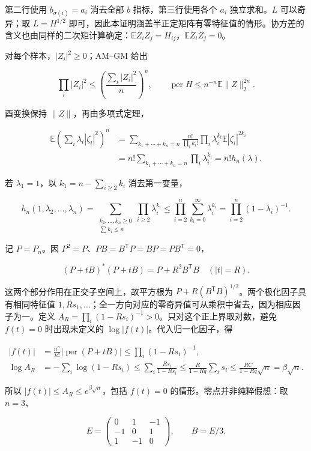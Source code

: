 \documentclass[11pt,a4paper]{article}
\begin{document}
第二行使用 \(b_{\sigma(i)}=a_i\) 消去全部 \(b\) 指标，第三行使用各个 \(a_i\) 独立求和。\(L\) 可以奇异；取 \(L=H^{1/2}\) 即可，因此本证明涵盖半正定矩阵有零特征值的情形。协方差的含义也由同样的二次矩计算确定：\(\mathbb EZ_i\overline Z_j=H_{ij}\)，\(\mathbb EZ_iZ_j=0\)。

对每个样本，\(|Z_i|^2\ge0\)；AM--GM 给出

\[
\prod_i|Z_i|^2\le\left(\frac{\sum_i|Z_i|^2}{n}\right)^n,
\qquad \operatorname{per}H\le n^{-n}\mathbb E\|Z\|_2^{2n}.
\]

酉变换保持 \(\|Z\|\)，再由多项式定理，

\[
\begin{aligned}
\mathbb E\left(\sum_i\lambda_i|\zeta_i|^2\right)^n
&=\sum_{k_1+\cdots+k_n=n}\frac{n!}{\prod_i k_i!}
\prod_i\lambda_i^{k_i}\mathbb E|\zeta_i|^{2k_i}\\
&=n!\sum_{k_1+\cdots+k_n=n}\prod_i\lambda_i^{k_i}
=n!h_n(\lambda).
\end{aligned}
\]

若 \(\lambda_1=1\)，以 \(k_1=n-\sum_{i\ge2}k_i\) 消去第一变量，

\[
h_n(1,\lambda_2,\ldots,\lambda_n)
=\sum_{\substack{k_2,\ldots,k_n\ge0\\\sum k_i\le n}}\prod_{i\ge2}\lambda_i^{k_i}
\le\prod_{i=2}^n\sum_{k_i=0}^{\infty}\lambda_i^{k_i}
=\prod_{i=2}^n(1-\lambda_i)^{-1}.
\]

记 \(P=P_n\)。因 \(P^2=P\)、\(PB=B^{\mathsf T}P=BP=PB^{\mathsf T}=0\)，

\[
(P+tB)^*(P+tB)=P+R^2B^{\mathsf T}B
\quad(|t|=R).
\]

这两个部分作用在正交子空间上，故平方根为 \(P+R(B^{\mathsf T}B)^{1/2}\)。两个极化因子具有相同特征值 \(1,Rs_1,\ldots\)；全一方向对应的零奇异值可从乘积中省去，因为相应因子为一。定义 \(A_R=\prod_i(1-Rs_i)^{-1}>0\)。只对这个正上界取对数，避免 \(f(t)=0\) 时出现未定义的 \(\log|f(t)|\)。代入归一化因子，得

\[
\begin{aligned}
|f(t)|&=\frac{n^n}{n!}|\operatorname{per}(P+tB)|
\le\prod_i(1-Rs_i)^{-1},\\
\log A_R&=-\sum_i\log(1-Rs_i)\le\sum_i\frac{Rs_i}{1-Rs_i}
\le\frac R{1-Rq}\sum_i s_i
\le\frac{RC}{1-Rq}\sqrt n=\beta\sqrt n.
\end{aligned}
\]

所以 \(|f(t)|\le A_R\le e^{\beta\sqrt n}\)，包括 \(f(t)=0\) 的情形。零点并非纯粹假想：取 \(n=3\)、

\[
E=\begin{pmatrix}0&1&-1\\-1&0&1\\1&-1&0\end{pmatrix},\qquad B=E/3.
\]
\end{document}
